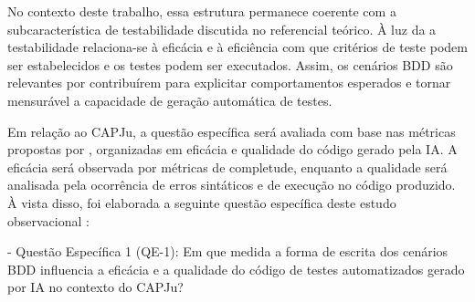 No contexto deste trabalho, essa estrutura permanece coerente com a subcaracterística de testabilidade discutida no referencial teórico. À luz da  a testabilidade relaciona-se à eficácia e à eficiência com que critérios de teste podem ser estabelecidos e os testes podem ser executados. Assim, os cenários BDD são relevantes por contribuírem para explicitar comportamentos esperados e tornar mensurável a capacidade de geração automática de testes.

Em relação ao CAPJu, a questão específica será avaliada com base nas métricas propostas por , organizadas em eficácia e qualidade do código gerado pela IA. A eficácia será observada por métricas de completude, enquanto a qualidade será analisada pela ocorrência de erros sintáticos e de execução no código produzido. À vista disso, foi elaborada a seguinte questão específica deste estudo observacional :

- Questão Específica 1 (QE-1): Em que medida a forma de escrita dos cenários BDD influencia a eficácia e a qualidade do código de testes automatizados gerado por IA no contexto do CAPJu?

